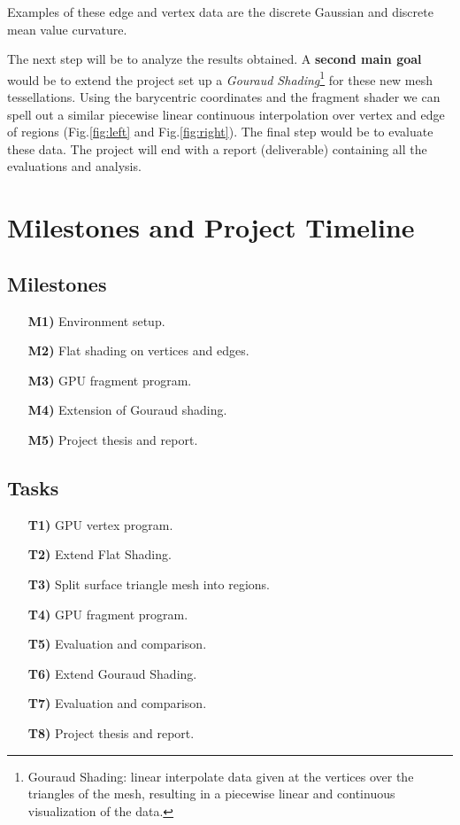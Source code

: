 \documentclass[11pt]{article}
\begin{document}
Examples of these edge and vertex data are the discrete Gaussian and discrete mean value curvature.

The next step will be to analyze the results obtained. A \textbf{second main goal} would be to extend the project set up a \textit{Gouraud Shading}\footnote{Gouraud Shading: linear interpolate data given at the vertices over the triangles of the mesh, resulting in a piecewise linear and continuous visualization of the data.}
for these new mesh tessellations. Using the barycentric coordinates and the fragment shader we can spell out a similar piecewise linear continuous interpolation over vertex and edge of regions (Fig.\ref{fig:left} and Fig.\ref{fig:right}).
The final step would be to evaluate these data. The project will end with a report (deliverable) containing all the evaluations and analysis.


\section{Milestones and Project Timeline} 
\subsection{Milestones}
\begin{itemize}
\item [\textbf{M1)}] Environment setup.
\item [\textbf{M2)}] Flat shading on vertices and edges.
\item [\textbf{M3)}] GPU fragment program.
\item [\textbf{M4)}] Extension of Gouraud shading.
\item [\textbf{M5)}] Project thesis and report.
\end{itemize}

\subsection{Tasks}
\begin{itemize}
  \item [\textbf{T1)}] GPU vertex program.
  \item [\textbf{T2)}] Extend Flat Shading.
  \item [\textbf{T3)}] Split surface triangle mesh into regions.
  \item [\textbf{T4)}] GPU fragment program.
  \item [\textbf{T5)}] Evaluation and comparison.
  \item [\textbf{T6)}] Extend Gouraud Shading.
  \item [\textbf{T7)}] Evaluation and comparison.
  \item [\textbf{T8)}] Project thesis and report.
  \end{itemize}
\end{document}
